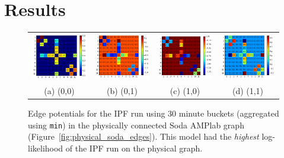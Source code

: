 \section{Results}

\begin{figure}
\centering
\begin{tabular}{cccc}
\includegraphics[width=1.3in]{figs/30minmin00conf} & \includegraphics[width=1.3in]{figs/30minmin01conf} & \includegraphics[width=1.3in]{figs/30minmin10conf} & \includegraphics[width=1.3in]{figs/30minmin11conf} \\
(a) (0,0) & (b) (0,1) & (c) (1,0) & (d) (1,1) \\[6pt]
\end{tabular}
\caption{Edge potentials for the IPF run using 30 minute buckets (aggregated using \texttt{min}) in the physically connected Soda AMPlab graph (Figure~\ref{fig:physical_soda_edges}). This model had the \emph{highest} log-likelihood of the IPF run on the physical graph.}
\label{fig:30minminphysical}
\end{figure}

